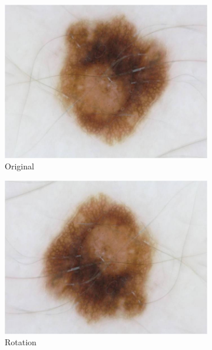 \begin{figure}[t]
	\centering
	\begin{subfigure}{0.24\linewidth}
		\includegraphics[width=\textwidth]{./pics/augmentations/original.jpg}
		\caption{Original}
		\label{subfig:aug_original}
	\end{subfigure}
	\begin{subfigure}{0.24\linewidth}
		\includegraphics[width=\textwidth]{./pics/augmentations/rotation.png}
		\caption{Rotation}
		\label{subfig:aug_rot}
	\end{subfigure}
	\begin{subfigure}{0.24\linewidth}

\end{subfigure}
\end{figure}
